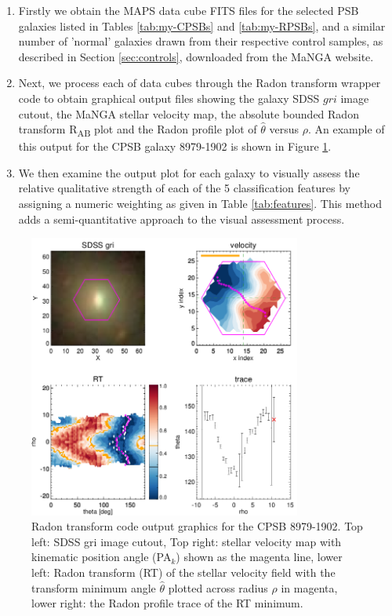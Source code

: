 \begin{enumerate}
    \item Firstly we obtain the MAPS data cube FITS files for the selected PSB galaxies listed in Tables \ref{tab:my-CPSBs} and \ref{tab:my-RPSBs}, and a similar number of 'normal' galaxies drawn from their respective control samples, as described in Section \ref{sec:controls}, downloaded from the MaNGA website.
    \item Next, we process each of data cubes through the Radon transform wrapper code to obtain graphical output files showing the galaxy SDSS $gri$ image cutout, the MaNGA stellar velocity map, the absolute bounded Radon transform R\textsubscript{AB} plot and the Radon profile plot of $\hat{\theta}$ versus $\rho$. An example of this output for the CPSB galaxy 8979-1902 is shown in Figure \ref{fig:CPSB-8979-1902-SNIP}. 
    \item  We then examine the output plot for each galaxy to  visually assess the relative qualitative strength of each of the 5 classification features by assigning a numeric weighting as given in Table \ref{tab:features}. This method adds a semi-quantitative approach to the visual assessment process.
\end{enumerate}

\begin{figure}
    \centering
    \includegraphics[width=0.8\textwidth]{images/RadonPlots/RT-SNIPS-NEW/CPSB-8979-1902-SNIP.png}
    \caption[Radon transform code output graphics for the CPSB 8979-1902]{Radon transform code output graphics for the CPSB 8979-1902. Top left: SDSS gri image cutout, Top right: stellar velocity map with kinematic position angle (PA$_{k}$) shown as the magenta line, lower left: Radon transform (RT) of the stellar velocity field with the transform minimum angle $\hat\theta$ plotted across radius $\rho$ in magenta, lower right: the Radon profile trace of the RT minimum.}
    \label{fig:CPSB-8979-1902-SNIP}
\end{figure}

